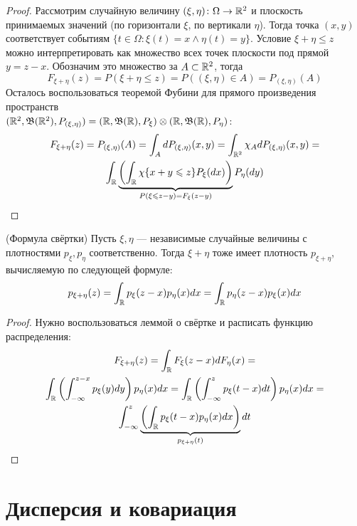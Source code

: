 \begin{proof}
	Рассмотрим случайную величину $(\xi, \eta) \colon \Omega \to \mathbb{R}^2$ и плоскость принимаемых значений (по горизонтали $\xi$, по вертикали $\eta$). Тогда точка $(x, y)$ соответствует событиям $\{t \in \Omega \colon \xi(t) = x \wedge \eta(t) = y\}$. Условие $\xi + \eta \le z$ можно интерпретировать как множество всех точек плоскости под прямой $y = z - x$. Обозначим это множество за $A \subset \mathbb{R}^2$, тогда
	\[
		F_{\xi + \eta}(z) = P(\xi + \eta \le z) = P((\xi, \eta) \in A) = P_{(\xi, \eta)}(A)
	\]
	Осталось воспользоваться теоремой Фубини для прямого произведения пространств \\ $(\mathbb{R}^2, \mathfrak{B}(\mathbb{R}^2), P_{(\xi, \eta)}) = (\mathbb{R}, \mathfrak{B}(\mathbb{R}), P_\xi) \otimes (\mathbb{R}, \mathfrak{B}(\mathbb{R}), P_\eta)$:
	\begin{multline*}
		F_{\xi + \eta}(z) = P_{(\xi, \eta)}(A) = \int_A dP_{(\xi, \eta)}(x, y) = \int_{\mathbb{R}^2} \chi_A dP_{(\xi, \eta)}(x, y) =
		\\
		\int_{\mathbb{R}} \underbrace{\left(\int_{\mathbb{R}} \chi\{x + y \leqslant z\} P_\xi(dx)\right)}_{P(\xi \leqslant z - y) = F_\xi(z - y)} P_\eta(dy)
	\end{multline*}
\end{proof}

\begin{corollary} (Формула свёртки)
	Пусть $\xi, \eta$ --- независимые случайные величины с плотностями $p_\xi, p_\eta$ соответственно. Тогда $\xi + \eta$ тоже имеет плотность $p_{\xi + \eta}$, вычисляемую по следующей формуле:
	\[
		p_{\xi + \eta}(z) = \int_{\mathbb{R}} p_\xi(z - x)p_\eta(x)dx = \int_{\mathbb{R}} p_\eta(z - x)p_\xi(x)dx
	\]
\end{corollary}

\begin{proof}
	Нужно воспользоваться леммой о свёртке и расписать функцию распределения:
	\begin{multline*}
		F_{\xi + \eta}(z) = \int_{\mathbb{R}} F_\xi(z - x)dF_\eta(x) =
		\\
		\int_{\mathbb{R}} \left(\int_{-\infty}^{z - x} p_\xi(y)dy\right) p_\eta(x)dx = \int_{\mathbb{R}} \left(\int_{-\infty}^z p_\xi(t - x)dt\right)p_\eta(x)dx =
		\\
		\int_{-\infty}^z \underbrace{\left(\int_{\mathbb{R}} p_\xi(t - x)p_\eta(x)dx\right)}_{p_{\xi + \eta}(t)}dt
	\end{multline*}
\end{proof}

\section{Дисперсия и ковариация}

